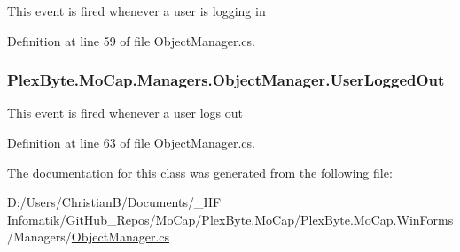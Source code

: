 This event is fired whenever a user is logging in 



Definition at line 59 of file Object\+Manager.\+cs.

\subsubsection[{\texorpdfstring{User\+Logged\+Out}{UserLoggedOut}}]{ Plex\+Byte.\+Mo\+Cap.\+Managers.\+Object\+Manager.\+User\+Logged\+Out}\hypertarget{class_plex_byte_1_1_mo_cap_1_1_managers_1_1_object_manager_a393d90bbcf2a71162eca1752bed2210d}{}\label{class_plex_byte_1_1_mo_cap_1_1_managers_1_1_object_manager_a393d90bbcf2a71162eca1752bed2210d}


This event is fired whenever a user logs out 



Definition at line 63 of file Object\+Manager.\+cs.



The documentation for this class was generated from the following file\+:\begin{DoxyCompactItemize}
\item 
D\+:/\+Users/\+Christian\+B/\+Documents/\+\_\+\+H\+F Infomatik/\+Git\+Hub\+\_\+\+Repos/\+Mo\+Cap/\+Plex\+Byte.\+Mo\+Cap/\+Plex\+Byte.\+Mo\+Cap.\+Win\+Forms/\+Managers/\hyperlink{_object_manager_8cs}{Object\+Manager.\+cs}\end{DoxyCompactItemize}
